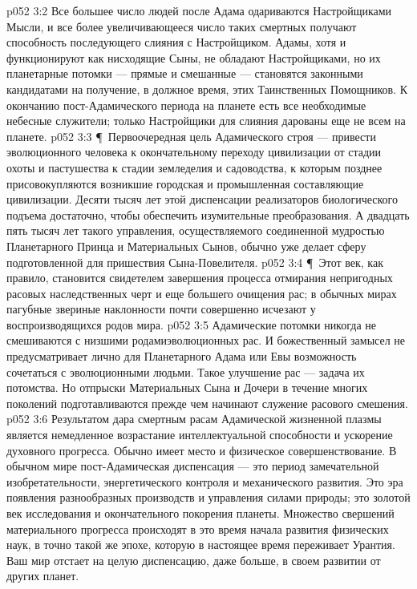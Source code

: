 \vs p052 3:2 Все большее число людей после Адама одариваются Настройщиками Мысли, и все более увеличивающееся число таких смертных получают способность последующего слияния с Настройщиком. Адамы, хотя и функционируют как нисходящие Сыны, не обладают Настройщиками, но их планетарные потомки --- прямые и смешанные --- становятся законными кандидатами на получение, в должное время, этих Таинственных Помощников. К окончанию пост\hyp{}Адамического периода на планете есть все необходимые небесные служители; только Настройщики для слияния дарованы еще не всем на планете.
\vs p052 3:3 \P\ Первоочередная цель Адамического строя --- привести эволюционного человека к окончательному переходу цивилизации от стадии охоты и пастушества к стадии земледелия и садоводства, к которым позднее присовокупляются возникшие городская и промышленная составляющие цивилизации. Десяти тысяч лет этой диспенсации реализаторов биологического подъема достаточно, чтобы обеспечить изумительные преобразования. А двадцать пять тысяч лет такого управления, осуществляемого соединенной мудростью Планетарного Принца и Материальных Сынов, обычно уже делает сферу подготовленной для пришествия Сына\hyp{}Повелителя.
\vs p052 3:4 \P\ Этот век, как правило, становится свидетелем завершения процесса отмирания непригодных расовых наследственных черт и еще большего очищения рас; в обычных мирах пагубные звериные наклонности почти совершенно исчезают у воспроизводящихся родов мира.
\vs p052 3:5 Адамические потомки никогда не смешиваются с низшими родамиэволюционных рас. И божественный замысел не предусматривает лично для Планетарного Адама или Евы возможность сочетаться с эволюционными людьми. Такое улучшение рас --- задача их потомства. Но отпрыски Материальных Сына и Дочери в течение многих поколений подготавливаются прежде чем начинают служение расового смешения.
\vs p052 3:6 Результатом дара смертным расам Адамической жизненной плазмы является немедленное возрастание интеллектуальной способности и ускорение духовного прогресса. Обычно имеет место и физическое совершенствование. В обычном мире пост\hyp{}Адамическая диспенсация --- это период замечательной изобретательности, энергетического контроля и механического развития. Это эра появления разнообразных производств и управления силами природы; это золотой век исследования и окончательного покорения планеты. Множество свершений материального прогресса происходят в это время начала развития физических наук, в точно такой же эпохе, которую в настоящее время переживает Урантия. Ваш мир отстает на целую диспенсацию, даже больше, в своем развитии от других планет.
